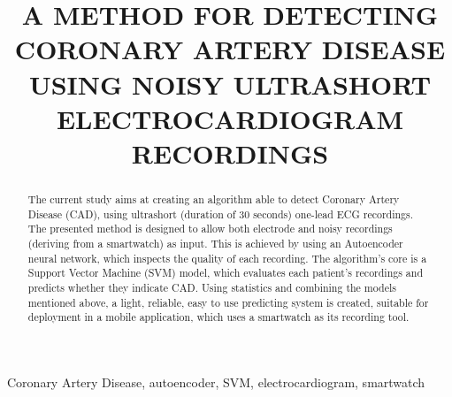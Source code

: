 \def\x{{\mathbf x}}
\def\L{{\cal L}}

\title{A METHOD FOR DETECTING CORONARY ARTERY DISEASE USING NOISY ULTRASHORT ELECTROCARDIOGRAM RECORDINGS}
%
 \address{$^{\star}$ Department of Electrical \& Computer Eng., Aristotle University of Thessaloniki, GR-54124, Greece\\
 $^{\dagger}$Department of Electrical \& Computer Eng., Khalifa University, PO Box 127788, UAE}
%
%
%

%
\maketitle
%
\begin{abstract}
The current study aims at creating an algorithm able to detect Coronary Artery Disease (CAD), using ultrashort (duration of 30 seconds) one-lead ECG recordings. The presented method is designed to allow both electrode and noisy recordings (deriving from a smartwatch) as input. This is achieved by using an Autoencoder neural network, which inspects the quality of each recording. The algorithm's core is a Support Vector Machine (SVM) model, which evaluates each patient's recordings and predicts whether they indicate CAD. Using statistics and combining the models mentioned above, a light, reliable, easy to use predicting system is created, suitable for deployment in a mobile application, which uses a smartwatch as its recording tool.
\end{abstract}
%
\begin{keywords}
Coronary Artery Disease, autoencoder, SVM, electrocardiogram, smartwatch
\end{keywords}
%
